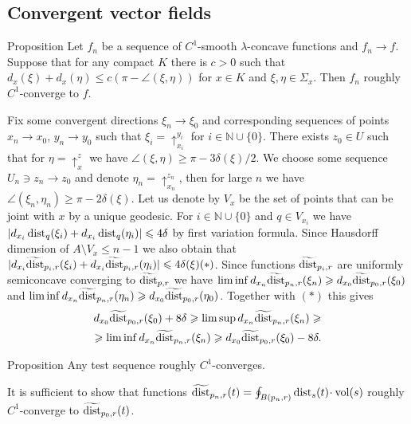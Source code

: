  
 
 
 
\subsection{ Convergent vector fields}

\begin{thm}{Proposition}
Let $f_n$ be a sequence of $C^1$-smooth $\lambda$-concave functions
and
$f_n\to f$.
Suppose that for any compact $K$ there is $c>0$ such that
$d_x(\xi)+d_x(\eta)\le c(\pi-\angle(\xi,\eta))$
for $x\in K$ and $\xi, \eta\in \Sigma_x$.
Then $f_n$ roughly $C^1$-converge to $f$. 
\end{thm}

Fix some convergent directions $\xi_n\to\xi_0$ and
corresponding sequences of points
$x_n\to x_0$, $y_n\to y_0$
such that  $\xi_i=\uparrow_{x_i}^{y_i}$ for $i\in\mathbb N\cup\{0\}$.
There exists $z_0 \in U$ such that for $\eta=\uparrow_x^z$ 
we have
$\angle(\xi,\eta)\ge \pi-3\delta(\xi)/2$.
We choose some sequence 
$U_n\ni z_n\to z_0$
and denote
$\eta_n=\uparrow_{x_n}^{z_n}$,
then for large $n$ we have $\angle(\xi_n,\eta_n)\ge \pi-2\delta(\xi)$.
Let us denote by $V_x$ be the set of points that can be joint with $x$
by a unique geodesic. For $i\in\mathbb N\cup\{0\}$ and
$q\in V_{x_i}$ we have $|d_{x_i} \operatorname{\rm dist}_q(\xi_i)+d_{x_i} \operatorname{\rm dist}_q(\eta_i)|\leqslant 4\delta$ by first
variation formula.
Since Hausdorff dimension of $A\setminus V_x\le n-1$ we also obtain
that
$|d_{x_i} \widetilde{\operatorname{\rm dist}}_{p_i,r}(\xi_i)+d_{x_i} \widetilde{\operatorname{\rm dist}}_{p_i,r}(\eta_i)|\leqslant 4\delta(\xi) (*)$.
Since functions
$\widetilde{\operatorname{\rm dist}}_{p_i,r}$ are uniformly semiconcave converging to
$\widetilde{\operatorname{\rm dist}}_{p,r}$ we have
$\liminf d_{x_n}\widetilde{\operatorname{\rm dist}}_{p_n,r}(\xi_n)\geqslant d_{x_0}\widetilde{\operatorname{\rm dist}}_{p_0,r}(\xi_0)$ and $\liminf d_{x_n}\widetilde{\operatorname{\rm dist}}_{p_n,r}(\eta_n)\geqslant d_{x_0}\widetilde{\operatorname{\rm dist}}_{p_0,r}(\eta_0)$.
Together with $(*)$ this gives
\begin{align*}
 d_{x_0}\widetilde{\operatorname{\rm dist}}_{p_0,r}(\xi_0)+8\delta\geqslant
\limsup d_{x_n}\widetilde{\operatorname{\rm dist}}_{p_n,r}(\xi_n)\geqslant\\
\geqslant
\liminf d_{x_n}\widetilde{\operatorname{\rm dist}}_{p_n,r}(\xi_n)\geqslant d_{x_0}\widetilde{\operatorname{\rm dist}}_{p_0,r}(\xi_0)-8\delta.
\end{align*}





\begin{thm}{Proposition}
Any test sequence roughly $C^1$-converges.
\end{thm}
It is sufficient to show  that functions
$\widetilde{\dist}_{p_n,r}(t) =\oint_{B(p_n,r)} \dist_{s}(t)\cdot\vol(s)$
roughly $C^1$-converge to $\widetilde{\operatorname{\rm dist}}_{p_0,r}(t)$.

